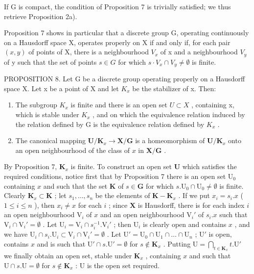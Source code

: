 If G is compact, the condition of Proposition 7 is trivially satisfied; we thus retrieve Proposition 2a).

Proposition 7 shows in particular that a discrete group G, operating continuously on a Hausdorff space X, operates properly on X if and only if, for each pair \((x, y)\) of points of X, there is a neighbourhood \(V_{x}\) of x and a neighbourhood \(V_{y}\) of y such that the set of points \(s \in G\) for which \(s \cdot V_{x} \cap V_{y} \neq \emptyset\) is finite.

PROPOSITION 8. Let G be a discrete group operating properly on a Hausdorff space X. Let x be a point of X and let \(K_{x}\) be the stabilizer of x. Then:

\begin{enumerate}
\def\labelenumi{\alph{enumi})}
\item
  The subgroup \(K_{x}\) is finite and there is an open set \(U \subset X\) , containing x, which is stable under \(K_{x}\) , and on which the equivalence relation induced by the relation defined by G is the equivalence relation defined by \(K_{x}\) .
\item
  The canonical mapping \(\mathbf{U} / \mathbf{K}_x\to \mathbf{X} / \mathbf{G}\) is a homeomorphism of \(\mathbf{U} / \mathbf{K}_x\) onto an open neighbourhood of the class of \(x\) in \(\mathbf{X} / \mathbf{G}\) .
\end{enumerate}

By Proposition 7, \(\mathbf{K}_x\) is finite. To construct an open set \(\mathbf{U}\) which satisfies the required conditions, notice first that by Proposition 7 there is an open set \(\mathrm{U}_0\) containing \(x\) and such that the set \(\mathbf{K}\) of \(s \in \mathbf{G}\) for which \(s. \mathrm{U}_0 \cap \mathrm{U}_0 \neq \emptyset\) is finite. Clearly \(\mathbf{K}_x \subset \mathbf{K}\) ; let \(s_1, \ldots, s_n\) be the elements of \(\mathbf{K} - \mathbf{K}_x\) . If we put \(x_i = s_i.x\) ( \(1 \leqslant i \leqslant n\) ), then \(x_i \neq x\) for each \(i\) ; since \(\mathbf{X}\) is Hausdorff, there is for each index \(i\) an open neighbourhood \(\mathrm{V}_i\) of \(x\) and an open neighbourhood \(\mathrm{V}_i'\) of \(s_i.x\) such that \(\mathrm{V}_i \cap \mathrm{V}_i' = \emptyset\) . Let \(\mathrm{U}_i = \mathrm{V}_i \cap s_i^{-1}. \mathrm{V}_i'\) ; then \(\mathrm{U}_i\) is clearly open and contains \(x\) , and we have \(\mathrm{U}_i \cap s_i. \mathrm{U}_i \subset \mathrm{V}_i \cap \mathrm{V}_i' = \emptyset\) . Let \(\mathrm{U}' = \mathrm{U}_0 \cap \mathrm{U}_1 \cap \ldots \cap \mathrm{U}_n\) ; \(\mathrm{U}'\) is open, contains \(x\) and is such that \(\mathrm{U}' \cap s. \mathrm{U}' = \emptyset\) for \(s \notin \mathbf{K}_x\) . Putting \(\mathrm{U} = \bigcap_{t \in \mathbf{K}_x} t. \mathrm{U}'\) we finally obtain an open set, stable under \(\mathbf{K}_x\) , containing \(x\) and such that \(\mathrm{U} \cap s. \mathrm{U} = \emptyset\) for \(s \notin \mathbf{K}_x\) : \(\mathrm{U}\) is the open set required.

